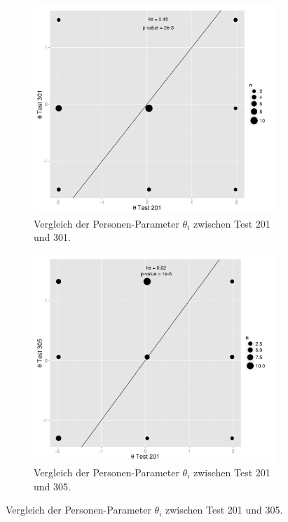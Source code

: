    
 \begin{figure}[htp]
 \centering
 \begin{subfigure}{0.49\textwidth}
   \includegraphics[width=1.0\linewidth]{graphics/GOF201301Pers.png}
   \caption{Vergleich der Personen-Parameter $\theta_i$ zwischen Test 201 und 301.}
   \label{fig:GOF201301P}
 \end{subfigure}
 \begin{subfigure}{0.49\textwidth}
   \includegraphics[width=1.0\linewidth]{graphics/GOF201305Pers.png}
   \caption{Vergleich der Personen-Parameter $\theta_i$ zwischen Test 201 und 305.}
   \label{fig:GOF201305P}
 \end{subfigure}


\end{figure}
